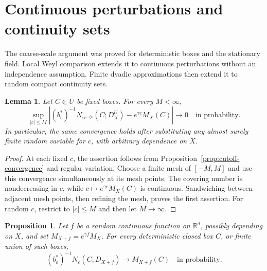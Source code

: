 \documentclass[11pt,letterpaper]{article}
\newcommand{\R}{\mathbb R}
\newcommand{\eps}{\varepsilon}
\newtheorem{proposition}[theorem]{Proposition}
\newtheorem{lemma}[theorem]{Lemma}
\theoremstyle{definition}
\theoremstyle{remark}
\numberwithin{equation}{section}
\begin{document}
\section{Continuous perturbations and continuity sets}

The coarse-scale argument was proved for deterministic boxes and the stationary field. Local Weyl comparison extends it to continuous perturbations without an independence assumption. Finite dyadic approximations then extend it to random compact continuity sets.

\begin{lemma}\label{lem:uniform-radius-shifts}
Let $C\Subset U$ be fixed boxes. For every $M<\infty$,
\begin{equation*}
 \sup_{|c|\le M}\left|
 (b_\eps^*)^{-1}N_{\eps e^{-\xi c}}(C;D_X^U)
 -e^{\gamma c}M_X(C)\right|
 \longrightarrow0\quad\text{in probability}.
\end{equation*}
In particular, the same convergence holds after substituting any almost surely finite random variable for $c$, with arbitrary dependence on $X$.
\end{lemma}

\begin{proof}
At each fixed $c$, the assertion follows from Proposition~\ref{prop:cutoff-convergence} and regular variation. Choose a finite mesh of $[-M,M]$ and use this convergence simultaneously at its mesh points. The covering number is nondecreasing in $c$, while $c\mapsto e^{\gamma c}M_X(C)$ is continuous. Sandwiching between adjacent mesh points, then refining the mesh, proves the first assertion. For random $c$, restrict to $|c|\le M$ and then let $M\to\infty$.
\end{proof}

\begin{proposition}\label{prop:weyl-extension}
Let $f$ be a random continuous function on $\R^d$, possibly depending on $X$, and set $M_{X+f}=e^{\gamma f}M_X$. For every deterministic closed box $C$, or finite union of such boxes,
\begin{equation*}
 (b_\eps^*)^{-1}N_\eps(C;D_{X+f})\longrightarrow M_{X+f}(C)
 \quad\text{in probability}.
\end{equation*}
\end{proposition}
\end{document}
